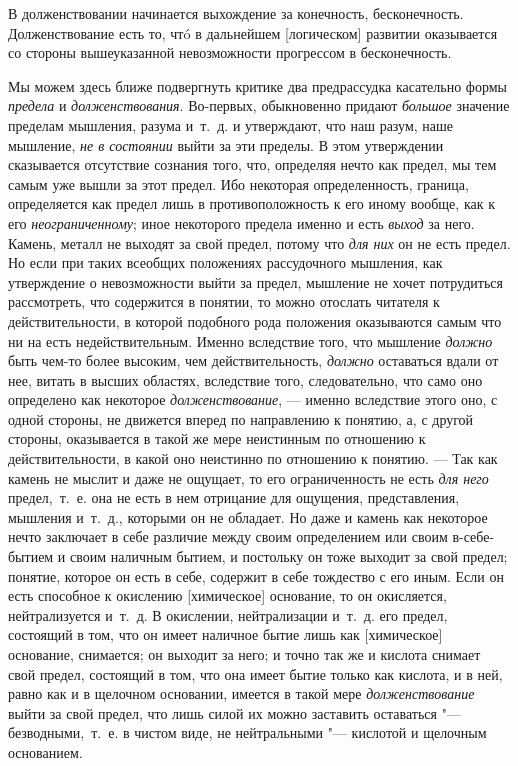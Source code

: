 В долженствовании начинается выхождение за конечность, бесконечность.
Долженствование есть то, чтó в дальнейшем [логическом] развитии оказывается
со стороны вышеуказанной невозможности прогрессом в бесконечность.

Мы можем здесь ближе подвергнуть критике два предрассудка касательно формы
{\em предела} и
{\em долженствования}. Во-первых, обыкновенно придают
{\em большое} значение пределам мышления, разума
и~т.~д. и утверждают, что наш разум, наше мышление,
{\em не в состоянии} выйти за эти пределы. В этом
утверждении сказывается отсутствие сознания того, что, определяя нечто как предел,
мы тем самым уже вышли за этот предел. Ибо некоторая определенность, граница,
определяется как предел лишь в противоположность к его иному вообще, как
к его {\em неограниченному}; иное некоторого предела
именно и есть {\em выход} за него. Камень, металл не
выходят за свой предел, потому что {\em для них} он не
есть предел. Но если при таких всеобщих положениях рассудочного мышления,
как утверждение о невозможности выйти за предел, мышление не хочет
потрудиться рассмотреть, что содержится в понятии, то можно отослать
читателя к действительности, в которой подобного рода положения оказываются
самым что ни на есть недействительным. Именно вследствие того, что мышление
{\em должно} быть чем-то более высоким, чем
действительность, {\em должно} оставаться вдали от нее,
витать в высших областях, вследствие того, следовательно, что само оно
определено как некоторое {\em долженствование}, —
именно вследствие этого оно, с одной стороны, не движется вперед по
направлению к понятию, а, с другой стороны, оказывается в такой же мере
неистинным по отношению к действительности, в какой оно неистинно по
отношению к понятию. — Так как камень не мыслит и даже не ощущает, то его
ограниченность не есть {\em для него} предел,~т.~е. она
не есть в нем отрицание для ощущения, представления, мышления и~т.~д.,
которыми он не обладает. Но даже и камень как некоторое нечто заключает в
себе различие между своим определением или своим в-себе-бытием и своим
наличным бытием, и постольку он тоже выходит за свой предел; понятие,
которое он есть в себе, содержит в себе тождество с его иным. Если он
есть способное к окислению [химическое] основание, то он окисляется,
нейтрализуется и~т.~д. В окислении, нейтрализации и~т.~д. его предел,
состоящий в том, что он имеет наличное бытие лишь как [химическое]
основание, снимается; он выходит за него; и точно так же и кислота снимает
свой предел, состоящий в том, что она имеет бытие только как кислота, и в
ней, равно как и в щелочном основании, имеется в такой мере
{\em долженствование} выйти за свой предел, что лишь
силой их можно заставить оставаться "--- безводными,~т.~е. в чистом виде, не
нейтральными "--- кислотой и щелочным основанием.

